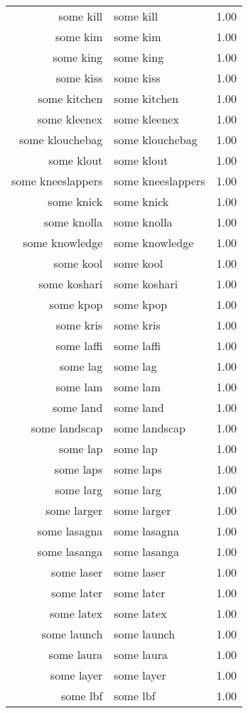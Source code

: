 \begin{table}[ht]
\begin{tabular}{rlr}
  some kill & some kill & 1.00 \\ 
  some kim & some kim & 1.00 \\ 
  some king & some king & 1.00 \\ 
  some kiss & some kiss & 1.00 \\ 
  some kitchen & some kitchen & 1.00 \\ 
  some kleenex & some kleenex & 1.00 \\ 
  some klouchebag & some klouchebag & 1.00 \\ 
  some klout & some klout & 1.00 \\ 
  some kneeslappers & some kneeslappers & 1.00 \\ 
  some knick & some knick & 1.00 \\ 
  some knolla & some knolla & 1.00 \\ 
  some knowledge & some knowledge & 1.00 \\ 
  some kool & some kool & 1.00 \\ 
  some koshari & some koshari & 1.00 \\ 
  some kpop & some kpop & 1.00 \\ 
  some kris & some kris & 1.00 \\ 
  some laffi & some laffi & 1.00 \\ 
  some lag & some lag & 1.00 \\ 
  some lam & some lam & 1.00 \\ 
  some land & some land & 1.00 \\ 
  some landscap & some landscap & 1.00 \\ 
  some lap & some lap & 1.00 \\ 
  some laps & some laps & 1.00 \\ 
  some larg & some larg & 1.00 \\ 
  some larger & some larger & 1.00 \\ 
  some lasagna & some lasagna & 1.00 \\ 
  some lasanga & some lasanga & 1.00 \\ 
  some laser & some laser & 1.00 \\ 
  some later & some later & 1.00 \\ 
  some latex & some latex & 1.00 \\ 
  some launch & some launch & 1.00 \\ 
  some laura & some laura & 1.00 \\ 
  some layer & some layer & 1.00 \\ 
  some lbf & some lbf & 1.00 \\ 

\end{tabular}
\end{table}
